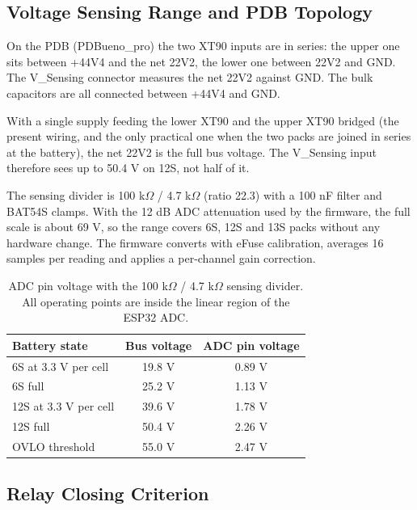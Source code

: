 \documentclass[11pt,a4paper]{article}
\begin{document}
\subsection{Voltage Sensing Range and PDB Topology}
\label{sec:review_vsense}

On the PDB (PDBueno\_pro) the two XT90 inputs are in series: the upper one sits between +44V4 and the net 22V2, the lower one between 22V2 and GND. The V\_Sensing connector measures the net 22V2 against GND. The bulk capacitors are all connected between +44V4 and GND.

With a single supply feeding the lower XT90 and the upper XT90 bridged (the present wiring, and the only practical one when the two packs are joined in series at the battery), the net 22V2 is the full bus voltage. The V\_Sensing input therefore sees up to 50.4 V on 12S, not half of it.

The sensing divider is 100 k$\Omega$ / 4.7 k$\Omega$ (ratio 22.3) with a 100 nF filter and BAT54S clamps. With the 12 dB ADC attenuation used by the firmware, the full scale is about 69 V, so the range covers 6S, 12S and 13S packs without any hardware change. The firmware converts with eFuse calibration, averages 16 samples per reading and applies a per-channel gain correction.

\begin{table}[H]
\centering
\begin{tabular}{lcc}
\toprule
Battery state & Bus voltage & ADC pin voltage \\
\midrule
6S at 3.3 V per cell & 19.8 V & 0.89 V \\
6S full & 25.2 V & 1.13 V \\
12S at 3.3 V per cell & 39.6 V & 1.78 V \\
12S full & 50.4 V & 2.26 V \\
OVLO threshold & 55.0 V & 2.47 V \\
\bottomrule
\end{tabular}
\caption{ADC pin voltage with the 100 k$\Omega$ / 4.7 k$\Omega$ sensing divider. All operating points are inside the linear region of the ESP32 ADC.}
\end{table}

\subsection{Relay Closing Criterion}
\label{sec:review_threshold}
\end{document}
